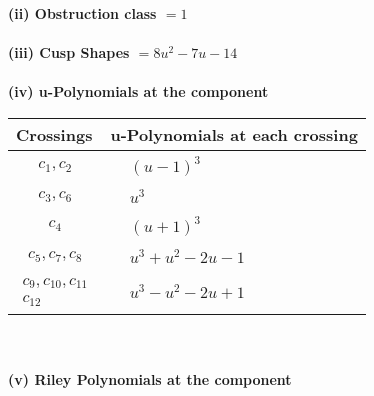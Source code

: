 \documentclass[1p]{elsarticle_modified}
\theoremstyle{definition}
\begin{document}
\flushleft \textbf{(ii) Obstruction class $= 1$}\\~\\
\flushleft \textbf{(iii) Cusp Shapes $= 8 u^2-7 u-14$}\\~\\
\newpage\renewcommand{\arraystretch}{1}
\flushleft \textbf{(iv) u-Polynomials at the component}\newline \\
\begin{tabular}{m{50pt}|m{274pt}}
Crossings & \hspace{64pt}u-Polynomials at each crossing \\
\hline $$\begin{aligned}c_{1},c_{2}\end{aligned}$$&$\begin{aligned}
&(u-1)^3
\end{aligned}$\\
\hline $$\begin{aligned}c_{3},c_{6}\end{aligned}$$&$\begin{aligned}
&u^3
\end{aligned}$\\
\hline $$\begin{aligned}c_{4}\end{aligned}$$&$\begin{aligned}
&(u+1)^3
\end{aligned}$\\
\hline $$\begin{aligned}c_{5},c_{7},c_{8}\end{aligned}$$&$\begin{aligned}
&u^3+u^2-2 u-1
\end{aligned}$\\
\hline $$\begin{aligned}c_{9},c_{10},c_{11}\\c_{12}\end{aligned}$$&$\begin{aligned}
&u^3- u^2-2 u+1
\end{aligned}$\\
\hline
\end{tabular}\\~\\
\newpage\renewcommand{\arraystretch}{1}
\flushleft \textbf{(v) Riley Polynomials at the component}\newline \\
\end{document}
